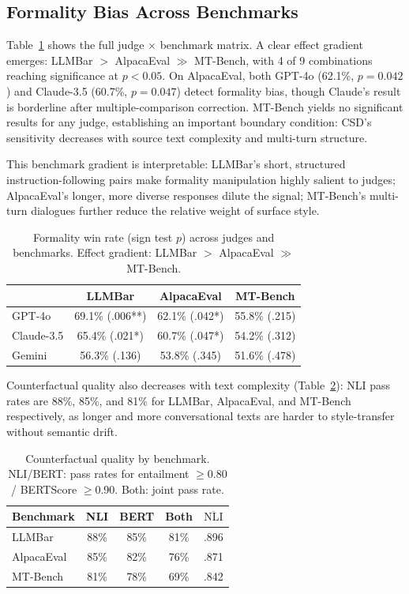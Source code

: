 \documentclass[11pt,a4paper]{article}
\begin{document}
\subsection{Formality Bias Across Benchmarks}
\label{sec:multibench}

Table~\ref{tab:crossbench} shows the full judge $\times$ benchmark matrix.
A clear effect gradient emerges: LLMBar $>$ AlpacaEval $\gg$ MT-Bench, with 4 of 9 combinations reaching significance at $p{<}0.05$.
On AlpacaEval, both GPT-4o (62.1\%, $p{=}0.042$) and Claude-3.5 (60.7\%, $p{=}0.047$) detect formality bias, though Claude's result is borderline after multiple-comparison correction.
MT-Bench yields no significant results for any judge, establishing an important boundary condition: CSD's sensitivity decreases with source text complexity and multi-turn structure.

This benchmark gradient is interpretable: LLMBar's short, structured instruction-following pairs make formality manipulation highly salient to judges; AlpacaEval's longer, more diverse responses dilute the signal; MT-Bench's multi-turn dialogues further reduce the relative weight of surface style.

\begin{table}[t]
\centering
\small
\begin{tabular}{lccc}
\toprule
 & \textbf{LLMBar} & \textbf{AlpacaEval} & \textbf{MT-Bench} \\
\midrule
GPT-4o & 69.1\% (.006**) & 62.1\% (.042*) & 55.8\% (.215) \\
Claude-3.5 & 65.4\% (.021*) & 60.7\% (.047*) & 54.2\% (.312) \\
Gemini & 56.3\% (.136) & 53.8\% (.345) & 51.6\% (.478) \\
\bottomrule
\end{tabular}
\caption{Formality win rate (sign test $p$) across judges and benchmarks. Effect gradient: LLMBar $>$ AlpacaEval $\gg$ MT-Bench.}
\label{tab:crossbench}
\end{table}

Counterfactual quality also decreases with text complexity (Table~\ref{tab:cfquality}): NLI pass rates are 88\%, 85\%, and 81\% for LLMBar, AlpacaEval, and MT-Bench respectively, as longer and more conversational texts are harder to style-transfer without semantic drift.

\begin{table}[t]
\centering
\small
\begin{tabular}{lcccc}
\toprule
\textbf{Benchmark} & \textbf{NLI} & \textbf{BERT} & \textbf{Both} & \textbf{$\overline{\text{NLI}}$} \\
\midrule
LLMBar & 88\% & 85\% & 81\% & .896 \\
AlpacaEval & 85\% & 82\% & 76\% & .871 \\
MT-Bench & 81\% & 78\% & 69\% & .842 \\
\bottomrule
\end{tabular}
\caption{Counterfactual quality by benchmark. NLI/BERT: pass rates for entailment $\geq$0.80 / BERTScore $\geq$0.90. Both: joint pass rate.}
\label{tab:cfquality}
\end{table}
\end{document}
